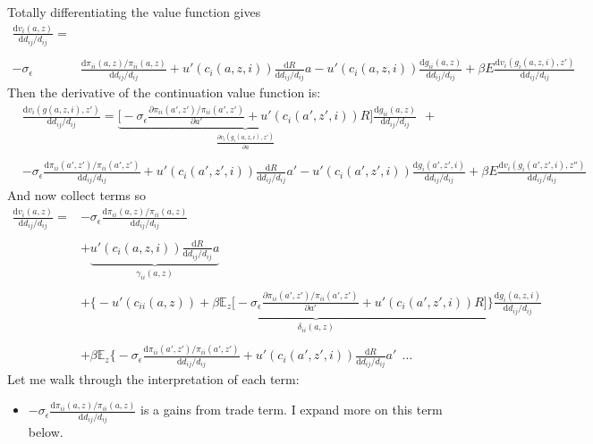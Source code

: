 \documentclass[12pt,pdftex]{article}
\begin{document}
\begin{onehalfspacing}
Totally differentiating the value function gives
\begin{align}
\frac{\mathrm{d} v_i(a, z)}{\mathrm{d} d_{ij} / d_{ij}} =& \nonumber  \\
\nonumber \\
 -\sigma_{\epsilon} & \frac{\mathrm{d} \pi_{ii}(a,z) / \pi_{ii}(a,z)}{\mathrm{d}d_{ij} / d_{ij}}  + u'(c_{i}(a,z,i))\frac{\mathrm{d} R}{\mathrm{d} d_{ij} / d_{ij}}a - u'(c_{i}(a,z,i))\frac{\mathrm{d} g_{ii}(a,z)}{\mathrm{d} d_{ij} / d_{ij}}
+ \beta E \frac{\mathrm{d} v_i(g_{i}(a,z,i), z')}{\mathrm{d} d_{ij} / d_{ij}}
\end{align}
Then the derivative of the continuation value function is:
\begin{align}
& \frac{\mathrm{d} v_i(g(a,z,i), z')}{\mathrm{d} d_{ij} / d_{ij}} = \underbrace{\bigg [-\sigma_{\epsilon} \frac{\partial \pi_{ii}(a',z') / \pi_{ii}(a',z')}{\partial a'} + u'(c_{i}(a',z',i))R \bigg ]}_{\frac{\partial v_i(g_{i}(a,z,i), z')}{\partial a}}\frac{\mathrm{d} g_{ii}(a,z)}{\mathrm{d} d_{ij} / d_{ij}} \ \ + \\
\nonumber \\
& -\sigma_{\epsilon} \frac{\mathrm{d} \pi_{ii}(a',z') / \pi_{ii}(a',z')}{\mathrm{d}d_{ij} / d_{ij}}   + u'(c_{i}(a',z',i))\frac{\mathrm{d} R}{\mathrm{d} d_{ij} / d_{ij}}a' - u'(c_{i}(a',z',i))\frac{\mathrm{d} g_{i}(a',z',i)}{\mathrm{d} d_{ij} / d_{ij}}
+ \beta E \frac{\mathrm{d} v_i(g_{i}(a',z',i), z'')}{\mathrm{d} d_{ij} / d_{ij}}
\end{align}
And now collect terms so
\begin{align}
\frac{\mathrm{d} v_i(a, z)}{\mathrm{d} d_{ij} / d_{ij}} =& -\sigma_{\epsilon} \frac{\mathrm{d} \pi_{ii}(a,z) / \pi_{ii}(a,z)}{\mathrm{d}d_{ij} / d_{ij}} \\
\nonumber \\
& + \underbrace{u'(c_{i}(a,z,i))\frac{\mathrm{d} R}{\mathrm{d} d_{ij} / d_{ij}}a}_{\gamma_{ii}(a,z)}  \\
\nonumber \\
& + \underbrace{\bigg \{- u'(c_{ii}(a,z)) + \beta \mathbb{E}_z \big [-\sigma_{\epsilon} \frac{\partial \pi_{ii}(a',z') / \pi_{ii}(a',z')}{\partial a'} + u'(c_{i}(a',z',i))R \big ] \bigg \}\frac{\mathrm{d} g_{i}(a,z,i)}{\mathrm{d} d_{ij} / d_{ij}}}_{\delta_{ii}(a,z)} \\
\nonumber \\
& + \beta \mathbb{E}_{z} \bigg \{ -\sigma_{\epsilon} \frac{\mathrm{d} \pi_{ii}(a',z') / \pi_{ii}(a',z')}{\mathrm{d}d_{ij} / d_{ij}} +  u'(c_{i}(a',z',i))\frac{\mathrm{d} R}{\mathrm{d} d_{ij} / d_{ij}}a' \ \  \ldots
\label{eq:apx-welfare-vterms}
\end{align}
Let me walk through the interpretation of each term:
\begin{itemize}
\item $-\sigma_{\epsilon} \frac{\mathrm{d} \pi_{ii}(a,z) / \pi_{ii}(a,z)}{\mathrm{d}d_{ij} / d_{ij}}$ is a gains from trade term. I expand more on this term below.


\end{itemize}
\end{onehalfspacing}
\end{document}
